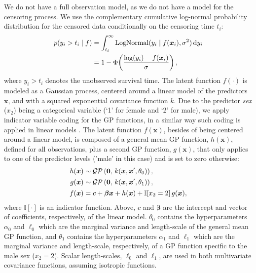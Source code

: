 We do not have a full observation model, as we do not have a model for the censoring process. We use the complementary cumulative log-normal probability distribution for the censored data conditionally on the censoring time $t_i$:
%
\begin{align*}
p(y_i > t_i \mid f) &= \int_{t_i}^{\infty} \operatorname{LogNormal}(y_i \mid f(\bm{x}_i),\sigma^2) \,\mathrm{d}y_i \\
&=  1 - \Phi\! \left( \frac{\log(y_i)-f(\bm{x}_i)}{\sigma} \right),
\end{align*}
%
where $y_i>t_i$ denotes the unobserved survival time.
The latent function $f(\cdot)$ is modeled as a Gaussian process, centered around a linear model of the predictors $\bm{x}$, and with a squared exponential covariance function $k$. Due to the predictor \textit{sex} ($x_2$) being a categorical variable (`1' for female and `2' for male), we apply indicator variable coding for the GP functions, in a similar way such coding is applied in linear models \citep{Gelman+Hill+Vehtari:2020:ROS}. The latent function $f(\bm{x})$, besides of being centered around a linear model, is composed of a general mean GP function, $h(\bm{x})$, defined for all observations, plus a second GP function, $g(\bm{x})$, that only applies to one of the predictor levels ('male' in this case) and is set to zero otherwise:
%
\begin{align*}
h(\bm{x}) &\sim \GP\left(\bm{0}, \, k(\bm{x},\bm{x}', \theta_0) \right),  \\[1pt] 
%
g(\bm{x}) &\sim \GP\left(\bm{0}, \, k(\bm{x},\bm{x}', \theta_1)\right),\\[1pt] 
%
f(\bm{x}) &= c + \bm{\beta} \bm{x} + h(\bm{x}) + \mathbb{I}\!\left[x_2=2\right]g(\bm{x}),
\end{align*}
%
where $\mathbb{I}\left[\cdot\right]$ is an indicator function. Above, $c$ and $\bm{\beta}$ are the intercept and vector of coefficients, respectively, of the linear model. $\theta_0$ contains the hyperparameters $\alpha_0$ and $\ell_0$ which are the marginal variance and length-scale of the general mean GP function, and $\theta_1$ contains the hyperparameters $\alpha_1$ and $\ell_1$ which are the marginal variance and length-scale, respectively, of a GP function specific to the male sex ($x_2=2$). Scalar length-scales, $\ell_0$ and $\ell_1$, are used in both multivariate covariance functions, assuming isotropic functions.
%
